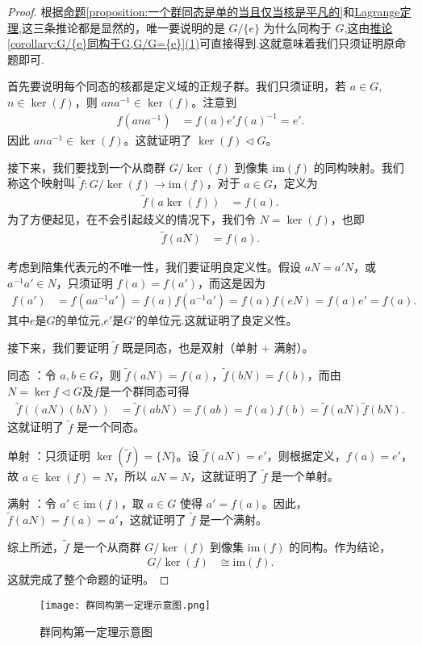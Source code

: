 \documentclass[../../main.tex]{subfiles}
\begin{document}
\begin{proof}
根据\hyperref[proposition:一个群同态是单的当且仅当核是平凡的]{命题\ref{proposition:一个群同态是单的当且仅当核是平凡的}}和\hyperref[theorem:Lagrange定理]{Lagrange定理},这三条推论都是显然的，唯一要说明的是 \(G/\{e\}\) 为什么同构于 \(G\),这由\hyperref[corollary:G/{e}同构于G,G/G={e}]{推论\ref{corollary:G/{e}同构于G,G/G={e}}(1)}可直接得到.这就意味着我们只须证明原命题即可.

首先要说明每个同态的核都是定义域的正规子群。我们只须证明，若 \(a \in G\),\(n \in \ker(f)\)，则 \(ana^{-1} \in \ker(f)\)。注意到
\begin{align*}
f(ana^{-1}) &= f(a)e'f(a)^{-1} = e' .
\end{align*}
因此 \(ana^{-1} \in \ker(f)\)。这就证明了 \(\ker(f) \lhd G\)。

接下来，我们要找到一个从商群 \(G/\ker(f)\) 到像集 \(\mathrm{im}(f)\) 的同构映射。我们称这个映射叫 \(\tilde{f}: G/\ker(f) \to \mathrm{im}(f)\)，对于 \(a \in G\)，定义为
\begin{align*}
\tilde{f}(a\ker(f)) &= f(a) .
\end{align*}
为了方便起见，在不会引起歧义的情况下，我们令 \(N = \ker(f)\)，也即
\begin{align*}
\tilde{f}(aN) &= f(a) .
\end{align*}

考虑到陪集代表元的不唯一性，我们要证明良定义性。假设 \(aN = a'N\)，或 \(a^{-1}a' \in N\)，只须证明 \(f(a) = f(a')\)，而这是因为
\begin{align*}
f(a') &= f(aa^{-1}a') = f(a)f(a^{-1}a') =f(a)f(eN)= f(a)e' = f(a) .
\end{align*}
其中$e$是$G$的单位元,$e'$是$G'$的单位元.这就证明了良定义性。

接下来，我们要证明 \(\tilde{f}\) 既是同态，也是双射（单射 + 满射）。

同态 ：令 \(a, b \in G\)，则 \(\tilde{f}(aN) = f(a)\)，\(\tilde{f}(bN) = f(b)\)，而由$N=\ker f \lhd G$及$f$是一个群同态可得
\begin{align*}
\tilde{f}((aN)(bN)) &= \tilde{f}(abN) = f(ab) = f(a)f(b) = \tilde{f}(aN)\tilde{f}(bN) .
\end{align*}
这就证明了 \(\tilde{f}\) 是一个同态。

单射 ：只须证明 \(\ker(\tilde{f}) = \{N\}\)。设 \(\tilde{f}(aN) = e'\)，则根据定义，\(f(a) = e'\)，故 \(a \in \ker(f) = N\)，所以 \(aN = N\)，这就证明了 \(\tilde{f}\) 是一个单射。

满射 ：令 \(a' \in \mathrm{im}(f)\)，取 \(a \in G\) 使得 \(a' = f(a)\)。因此，\(\tilde{f}(aN) = f(a) = a'\)，这就证明了 \(\tilde{f}\) 是一个满射。

综上所述，\(\tilde{f}\) 是一个从商群 \(G/\ker(f)\) 到像集 \(\mathrm{im}(f)\) 的同构。作为结论，
\begin{align*}
G/\ker(f) &\cong \mathrm{im}(f) .
\end{align*}
这就完成了整个命题的证明。 
\end{proof}
\begin{figure}[H]
\centering
\texttt{[image: 群同构第一定理示意图.png]}
\caption{群同构第一定理示意图}
\label{figure:群同构第一定理示意图}
\end{figure}
\end{document}
